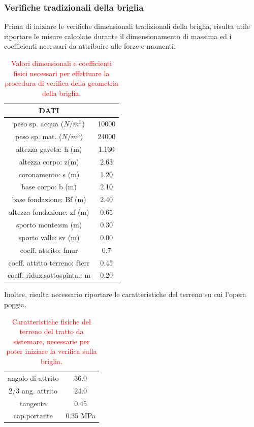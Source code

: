 \subsubsection{Verifiche tradizionali della briglia}
Prima di iniziare le verifiche dimensionali tradizionali della briglia, risulta utile riportare le misure calcolate durante il dimensionamento di massima ed i coefficienti necessari da attribuire alle forze e momenti.
\begin{table}[H] \centering
    \caption{\textcolor{red}{Valori dimensionali e coefficienti fisici necessari per effettuare la procedura di verifica della geometria della briglia.}}
    \begin{tabular}{cc}
    \toprule
    DATI                          &       \\
    \midrule
    peso sp. acqua ($N/m^3$)         & 10000 \\
    peso sp. mat. ($N/m^3$)          & 24000 \\
    altezza gaveta: h (m)         & 1.130 \\
    altezza corpo: z(m)           & 2.63  \\
    coronamento: s (m)            & 1.20  \\
    base corpo: b (m)              & 2.10  \\
    base fondazione: Bf (m)       & 2.40  \\
    altezza fondazione: zf (m)    & 0.65  \\
    sporto monte:sm (m)            & 0.30  \\
    sporto valle: sv (m)           & 0.00  \\
    coeff. attrito: fmur           & 0.7   \\
    coeff. attrito terreno: fterr & 0.45  \\
    coeff. riduz.sottospinta.: m  & 0.20  \\
    \bottomrule
    \end{tabular}
\end{table}
Inoltre, risulta necessario riportare le caratteristiche del terreno su cui l'opera poggia.
\begin{table}[H] \centering
    \caption{\textcolor{red}{Caratteristiche fisiche del terreno del tratto da sistemare, necessarie per poter iniziare la verifica sulla briglia.}}
    \begin{tabular}{cc}
    \toprule
    angolo di attrito & 36.0      \\
    2/3 ang. attrito  & 24.0      \\
    tangente          & 0.45      \\
    cap.portante      & 0.35 MPa \\
    \bottomrule
    \end{tabular}
    \end{table}

